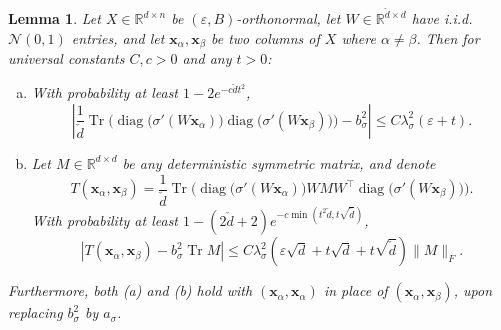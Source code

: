 \documentclass{article}
\newtheorem{lemma}[theorem]{Lemma}
\theoremstyle{definition}
\newcommand{\R}{\mathbb{R}}
\newcommand{\N}{\mathcal{N}}
\newcommand{\Tr}{\operatorname{Tr}}
\newcommand{\x}{\mathbf{x}}
\renewcommand{\a}{\alpha}
\renewcommand{\b}{\beta}
\newcommand{\eps}{\varepsilon}
\newcommand{\vd}{\check{d}}
\newcommand{\1}{\mathbf{1}}
\newcommand{\diag}{\operatorname{diag}}
\begin{document}
\begin{lemma}\label{lemma:onelayerapprox}
Let $X \in \R^{d \times n}$ be $(\eps,B)$-orthonormal, let $W \in \R^{\vd \times
d}$ have i.i.d.\ $\N(0,1)$ entries, and let $\x_\a,\x_\b$ be two columns
of $X$ where $\a \neq \b$. Then for universal constants $C,c>0$ and any $t>0$:
\begin{enumerate}[(a)]
\item With probability at least $1-2e^{-c\vd t^2}$,
\[\left|\frac{1}{\vd}\Tr \Big(\diag\big(\sigma'(W \x_\a)\big)
\diag\big(\sigma'(W \x_\b)\big)\Big)-b_\sigma^2\right| \leq
C\lambda_\sigma^2(\eps+t).\]
\item Let $M \in \R^{d \times d}$ be any deterministic symmetric matrix,
and denote
\[T(\x_\a,\x_\b)=\frac{1}{\vd}\Tr \Big(\diag\big(\sigma'(W\x_\a)\big)WMW^\top
\diag\big(\sigma'(W\x_\b)\big)\Big).\]
With probability at least $1-(2\vd+2)e^{-c\min(t^2\vd,t\sqrt{\vd})}$,
\[\left|T(\x_\a,\x_\b)-b_\sigma^2 \Tr M\right| \leq C\lambda_\sigma^2
\left(\eps\sqrt{d}+t\sqrt{d}+t\sqrt{\vd}\right)\|M\|_F.\]
\end{enumerate}
Furthermore, both (a) and (b) hold with $(\x_\a,\x_\a)$ in place of
$(\x_\a,\x_\b)$, upon replacing $b_\sigma^2$ by $a_\sigma$.
\end{lemma}
\end{document}
